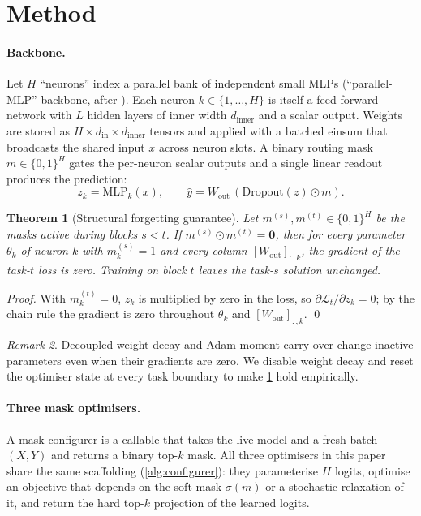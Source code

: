 \documentclass{article}
\theoremstyle{plain}
\newtheorem{theorem}{Theorem}[section]
\theoremstyle{remark}
\newtheorem{remark}[theorem]{Remark}
\begin{document}
\section{Method}
\label{sec:method}

\paragraph{Backbone.}
Let $H$ ``neurons'' index a parallel bank of independent small MLPs
(``parallel-MLP'' backbone, after \citealp{shazeer2017outrageously}).
Each neuron $k\in\{1,\ldots,H\}$ is itself a feed-forward network with
$L$ hidden layers of inner width $d_\mathrm{inner}$ and a scalar
output. Weights are stored as $H\times d_\mathrm{in}\times
d_\mathrm{inner}$ tensors and applied with a batched einsum that
broadcasts the shared input $x$ across neuron slots. A binary routing
mask $m\in\{0,1\}^H$ gates the per-neuron scalar outputs and a single
linear readout produces the prediction:
\[
  z_k = \mathrm{MLP}_k(x), \qquad \hat y = W_\mathrm{out}\,(\mathrm{Dropout}(z)\odot m).
\]

\begin{theorem}[Structural forgetting guarantee]
\label{thm:isolation}
Let $m^{(s)},m^{(t)}\in\{0,1\}^H$ be the masks active during blocks
$s<t$. If $m^{(s)}\odot m^{(t)}=\mathbf{0}$, then for every parameter
$\theta_k$ of neuron $k$ with $m^{(s)}_k=1$ and every column
$[W_\mathrm{out}]_{:,k}$, the gradient of the task-$t$ loss is zero.
Training on block $t$ leaves the task-$s$ solution unchanged.
\end{theorem}
\begin{proof}
With $m^{(t)}_k=0$, $z_k$ is multiplied by zero in the loss, so
$\partial\mathcal{L}_t/\partial z_k=0$; by the chain rule the gradient
is zero throughout $\theta_k$ and $[W_\mathrm{out}]_{:,k}$. \qed
\end{proof}
\begin{remark}\label{rem:caveats}
Decoupled weight decay and Adam moment carry-over change inactive
parameters even when their gradients are zero. We disable weight
decay and reset the optimiser state at every task boundary to make
\cref{thm:isolation} hold empirically.
\end{remark}

\paragraph{Three mask optimisers.}
A mask configurer is a callable that takes the live model and a fresh
batch $(X,Y)$ and returns a binary top-$k$ mask. All three optimisers
in this paper share the same scaffolding (\cref{alg:configurer}): they
parameterise $H$ logits, optimise an objective that depends on the
soft mask $\sigma(m)$ or a stochastic relaxation of it, and return the
hard top-$k$ projection of the learned logits.
\end{document}
